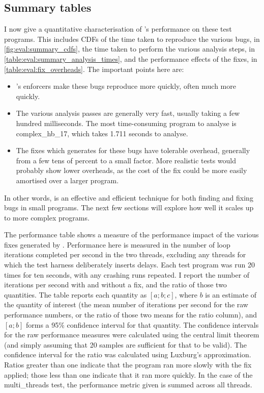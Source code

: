 \subsection{Summary tables}

I now give a quantitative characterisation of {\technique}'s
performance on these test programs.  This includes CDFs of the time
taken to reproduce the various bugs, in
\autoref{fig:eval:summary_cdfs}, the time taken to perform the various
analysis steps, in \autoref{table:eval:summary_analysis_times}, and
the performance effects of the fixes, in
\autoref{table:eval:fix_overheads}.  The important points here are:

\begin{itemize}
\item {\Technique}'s enforcers make these bugs reproduce more quickly,
  often much more quickly.
\item The various analysis passes are generally very fast, usually
  taking a few hundred milliseconds.  The most time-consuming program
  to analyse is complex\_hb\_17, which takes 1.711 seconds to analyse.
\item The fixes which {\technique} generates for these bugs have
  tolerable overhead, generally from a few tens of percent to a small
  factor.  More realistic tests would probably show lower overheads,
  as the cost of the fix could be more easily amortised over a larger
  program.
\end{itemize}

In other words, {\technique} is an effective and efficient technique
for both finding and fixing bugs in small programs.  The next few
sections will explore how well it scales up to more complex programs.

The performance table shows a measure of the performance impact of the
various fixes generated by {\technique}.  Performance here is measured
in the number of loop iterations completed per second in the two
threads, excluding any threads for which the test harness deliberately
inserts delays.  Each test program was run 20 times for ten seconds,
with any crashing runs repeated.  I report the number of iterations
per second with and without a fix, and the ratio of those two
quantities.  The table reports each quantity as $[a; b; c]$, where $b$
is an estimate of the quantity of interest (the mean number of
iterations per second for the raw performance numbers, or the ratio of
those two means for the ratio column), and $[a;b]$ forms a 95\%
confidence interval for that quantity.  The confidence intervals for
the raw performance measures were calculated using the central limit
theorem (and simply assuming that 20 samples are sufficient for that
to be valid).  The confidence interval for the ratio was calculated
using Luxburg's approximation\needCite{}.  Ratios greater than one
indicate that the program ran more slowly with the fix applied; those
less than one indicate that it ran more quickly.  In the case of the
multi\_threads test, the performance metric given is summed across all
threads.


